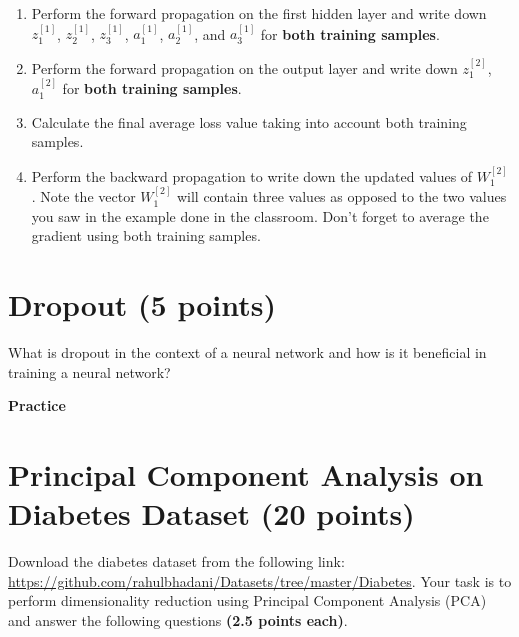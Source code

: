 \documentclass[12pt, xcolor=dvipsnames,svgnames,x11names]{article}
\begin{document}
\begin{enumerate}
    \item Perform the forward propagation on the first hidden layer and write down $z_1^{[1]}$, $z_2^{[1]}$, $z_3^{[1]}$, $a_1^{[1]}$, $a_2^{[1]}$, and $a_3^{[1]}$ for \textbf{both training samples}.
    \item Perform the forward propagation on the output layer and write down $z_1^{[2]}$, $a_1^{[2]}$ for \textbf{both training samples}.
    \item Calculate the final average loss value taking into account both training samples.
    \item Perform the backward propagation to write down the updated values of $W_1^{[2]}$. Note the vector $W_1^{[2]}$ will contain three values as opposed to the two values you saw in the example done in the classroom. Don't forget to average the gradient using both training samples.
    
\end{enumerate}


\section{Dropout (5 points)}
What is dropout in the context of a neural network and how is it beneficial in training a neural network?

\vspace{15pt}

{{\LARGE \textbf{Practice}}}


\section{Principal Component Analysis on Diabetes Dataset \textbf{(20 points)}}

Download the diabetes dataset from the following link: \url{https://github.com/rahulbhadani/Datasets/tree/master/Diabetes}. Your task is to perform dimensionality reduction using Principal Component Analysis (PCA) and answer the following questions \textbf{(2.5 points each)}.
\end{document}

